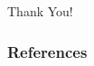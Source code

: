 \documentclass[article,10pt]{beamer}%
\begin{document}
\begin{frame}
\begin{center}
		\Huge{Thank You!}

	\end{center}\end{frame}
\begin{frame}[allowframebreaks]
\frametitle{References}


\end{frame}
\end{document}
